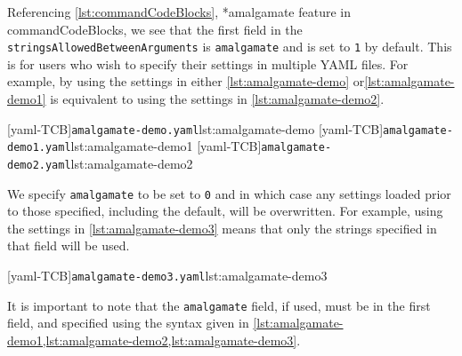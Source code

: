 \documentclass[10pt]{article}
\begin{document}
 Referencing \vref{lst:commandCodeBlocks}, *{amalgamate feature in
 commandCodeBlocks}, we see that the first field in the
 \texttt{stringsAllowedBetweenArguments} is \texttt{amalgamate} and is set to \texttt{1}
 by default. This is for users who wish to specify their settings in multiple YAML files.
 For example, by using the settings in either \cref{lst:amalgamate-demo}
 or\cref{lst:amalgamate-demo1} is equivalent to using the settings in
 \cref{lst:amalgamate-demo2}.%

 \begin{cmhtcbraster}[raster columns=3,
   raster left skip=-3.5cm,
   raster right skip=-2cm,
   raster column skip=.03\linewidth]
  [yaml-TCB]{\texttt{amalgamate-demo.yaml}}{lst:amalgamate-demo}
  [yaml-TCB]{\texttt{amalgamate-demo1.yaml}}{lst:amalgamate-demo1}
  [yaml-TCB]{\texttt{amalgamate-demo2.yaml}}{lst:amalgamate-demo2}
 \end{cmhtcbraster}

 We specify \texttt{amalgamate} to be set to \texttt{0} and in which case any settings
 loaded prior to those specified, including the default, will be overwritten. For
 example, using the settings in \cref{lst:amalgamate-demo3} means that only the strings
 specified in that field will be used.

 [yaml-TCB]{\texttt{amalgamate-demo3.yaml}}{lst:amalgamate-demo3}

 It is important to note that the \texttt{amalgamate} field, if used, must be in the
 first field, and specified using the syntax given in
 \cref{lst:amalgamate-demo1,lst:amalgamate-demo2,lst:amalgamate-demo3}.
\end{document}
